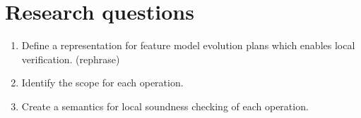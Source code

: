 \section{Research questions}
\label{sec:research-questions}

\begin{enumerate}[\itbf{RG\arabic*}, itemsep=0mm]
   \item Define a representation for feature model evolution plans which enables local verification. (rephrase)
   \item Identify the scope for each operation.
   \item Create a semantics for local soundness checking of each operation.
\end{enumerate}

